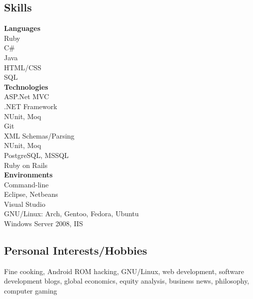 \documentclass[10pt]{article}
\begin{document}
\subsection*{Skills}
\begin{multicols*}{3}

\noindent \textbf{Languages} \vspace*{5pt}\\
Ruby\\
C\#\\
Java\\
HTML/CSS\\
\columnbreak
SQL\\
\noindent \textbf{Technologies} \vspace*{5pt} \\
ASP.Net MVC \\
.NET Framework \\
NUnit, Moq \\
Git\\
XML Schemas/Parsing\\
NUnit, Moq\\
PostgreSQL, MSSQL\\
\columnbreak
Ruby on Rails\\
\noindent \textbf{Environments} \vspace{5pt} \\
Command-line\\
Eclipse, Netbeans\\
Visual Studio\\
GNU/Linux: Arch, Gentoo, Fedora, \indent Ubuntu\\
Windows Server 2008, IIS\\
\end{multicols*}

{
\subsection*{Personal Interests/Hobbies}
\noindent
Fine cooking, Android ROM hacking, GNU/Linux, web development, software development blogs, global economics, equity analysis, business news, philosophy, computer gaming
}{}
\end{document}

